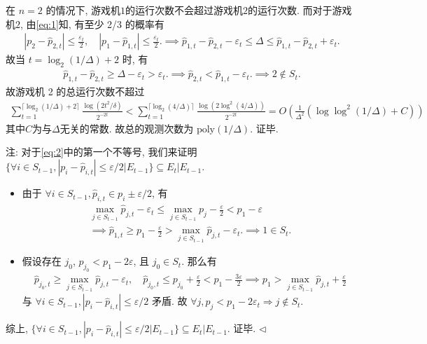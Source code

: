 \documentclass[11pt]{article}
\newenvironment{answer}[1][Solution]{\begin{trivlist}
    \item[\hskip \labelsep {\bfseries #1.}\hskip \labelsep]}{\hfill$\lhd$\end{trivlist}}
\newcommand\1{\mathds{1}}
\begin{document}
\begin{answer}
\begin{enumerate}[label=(\arabic*)]
        在 $n=2$ 的情况下, 游戏机$1$的运行次数不会超过游戏机$2$的运行次数. 而对于游戏机$2$, 由\eqref{eq:1}知, 有至少 2/3 的概率有
        \begin{align*}
            |p_2 - \hat{p}_{2,t}| \le \frac{\varepsilon_t}{2}, \quad |p_1 - \hat{p}_{1,t}| \le \frac{\varepsilon_t}{2}. \implies \hat{p}_{1,t} - \hat{p}_{2,t} - \varepsilon_t \le \Delta \le \hat{p}_{1,t} - \hat{p}_{2,t} + \varepsilon_t.
        \end{align*}
        故当 $t = \log_2(1/\Delta) + 2$ 时, 有
        \begin{align*}
            \hat{p}_{1,t} - \hat{p}_{2,t} \ge \Delta - \varepsilon_t > \varepsilon_t. \implies \hat{p}_{2,t} < \hat{p}_{1,t} - \varepsilon_t. \implies 2 \notin S_t.
        \end{align*}
        故游戏机 2 的总运行次数不超过
        \begin{align*}
            \sum_{t=1}^{\lceil\log_2(1/\Delta) + 2\rceil} \frac{\log(2t^2 / \delta)}{2^{-2t}} < \sum_{t=1}^{\lceil\log_2(4/\Delta)\rceil} \frac{\log(2\log^2(4/\Delta))}{2^{-2t}} = O\left(\frac{1}{\Delta^2}\left(\log\log^2(1/\Delta) + C\right)\right) 
        \end{align*}
        其中$C$为与$\Delta$无关的常数. 故总的观测次数为 $\mathrm{poly}(1/\Delta)$. 证毕.
    \end{enumerate}
    注: 对于\eqref{eq:2}中的第一个不等号, 我们来证明 $\{\forall i \in S_{t-1}, |p_i - \hat{p}_{i,t}| \le \varepsilon/2 | E_{t-1}\} \subseteq E_t|E_{t-1}$.
    \begin{itemize}
        \item 由于 $\forall i \in S_{t-1}, \hat{p}_{i,t}\in p_i \pm \varepsilon/2$, 有
        \begin{gather*}
            \max_{j\in S_{t-1}} \hat{p}_{j,t} - \varepsilon_t \le \max_{j\in S_{t-1}} p_j - \frac{\varepsilon}{2} < p_1 - \varepsilon  \\
            \implies \hat{p}_{1,t} \ge p_1 - \frac{\varepsilon}{2} >  \max_{j\in S_{t-1}} \hat{p}_{j,t} - \varepsilon_t. \implies 1 \in S_t.
        \end{gather*}
        \item 假设存在 $j_0$, $p_{j_0} < p_1 - 2\varepsilon$, 且 $j_0 \in S_t$. 那么有
        \begin{gather*}
            \hat{p}_{j_0,t} \ge \max_{j\in S_{t-1}} \hat{p}_{j,t} - \varepsilon_t, \quad \hat{p}_{j_0,t} \le p_{j_0} + \frac{\varepsilon}{2} < p_1 - \frac{3\varepsilon}{2}  \implies p_1 > \max_{j\in S_{t-1}} \hat{p}_{j,t} + \frac{\varepsilon}{2}
        \end{gather*}
        与 $\forall i \in S_{t-1}, |p_i - \hat{p}_{i,t}| \le \varepsilon/2$ 矛盾. 故 $\forall j, p_j < p_1 - 2 \varepsilon_t \Rightarrow j \notin S_t$.
    \end{itemize}
    综上, $\{\forall i \in S_{t-1}, |p_i - \hat{p}_{i,t}| \le \varepsilon/2 | E_{t-1}\} \subseteq E_t|E_{t-1}$. 证毕.
\end{answer}
\end{document}
